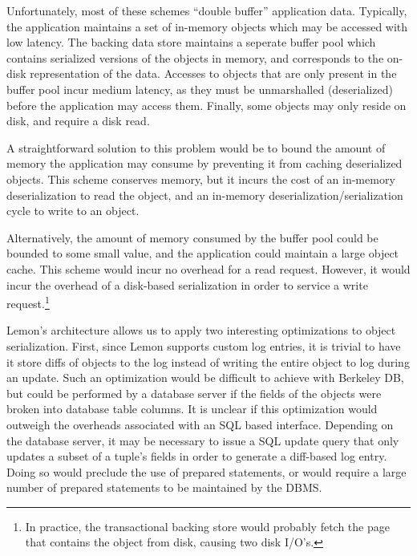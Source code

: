 \documentclass[letterpaper,twocolumn,english]{article}
\newcommand{\yad}{Lemon\xspace}
\begin{document}
Unfortunately, most of these schemes ``double buffer'' application
data.  Typically, the application maintains a set of in-memory objects
which may be accessed with low latency.  The backing data store
maintains a seperate buffer pool which contains serialized versions of
the objects in memory, and corresponds to the on-disk representation
of the data.  Accesses to objects that are only present in the buffer
pool incur medium latency, as they must be unmarshalled (deserialized)
before the application may access them.  Finally, some objects may
only reside on disk, and require a disk read.


A straightforward solution to this problem would be to bound
the amount of memory the application may consume by preventing it from
caching deserialized objects.  This scheme conserves memory, but it
incurs the cost of an in-memory deserialization to read the object,
and an in-memory deserialization/serialization cycle to write to an
object.

Alternatively, the amount of memory consumed by the buffer pool could
be bounded to some small value, and the application could maintain a
large object cache.  This scheme would incur no overhead for a read
request.  However, it would incur the overhead of a disk-based
serialization in order to service a write request.\footnote{In
practice, the transactional backing store would probably fetch the
page that contains the object from disk, causing two disk I/O's.}

\yad's architecture allows us to apply two interesting optimizations
to object serialization.  First, since \yad supports
custom log entries, it is trivial to have it store diffs of objects to
the log instead of writing the entire object to log during an update.
Such an optimization would be difficult to achieve with Berkeley DB,
but could be performed by a database server if the fields of the
objects were broken into database table columns.  It is unclear if
this optimization would outweigh the overheads associated with an SQL
based interface.  Depending on the database server, it may be
necessary to issue a SQL update query that only updates a subset of a
tuple's fields in order to generate a diff-based log entry.  Doing so
would preclude the use of prepared statements, or would require a large
number of prepared statements to be maintained by the DBMS.
\end{document}
